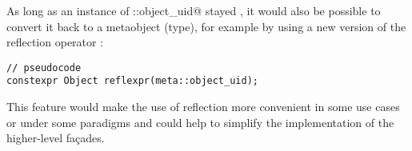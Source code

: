 As long as an instance of \verb@meta::object_uid@ stayed \verb@constexpr@, it would
also be possible to convert it back to a metaobject (type), for example by using
a new version of the reflection operator \verb@reflexpr@:

\begin{verbatim}
// pseudocode
constexpr Object reflexpr(meta::object_uid);
\end{verbatim}

This feature would make the use of reflection more convenient in some use cases
or under some paradigms and could help to simplify the implementation of the
higher-level fa\c{c}ades.
